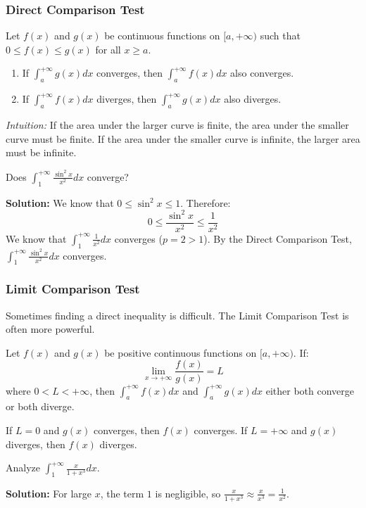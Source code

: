 \subsubsection{Direct Comparison Test}
\begin{theorem}
Let $f(x)$ and $g(x)$ be continuous functions on $[a, +\infty)$ such that $0 \leq f(x) \leq g(x)$ for all $x \geq a$.
\begin{enumerate}
    \item If $\int_a^{+\infty} g(x) dx$ converges, then $\int_a^{+\infty} f(x) dx$ also converges.
    \item If $\int_a^{+\infty} f(x) dx$ diverges, then $\int_a^{+\infty} g(x) dx$ also diverges.
\end{enumerate}
\end{theorem}
\textit{Intuition:} If the area under the larger curve is finite, the area under the smaller curve must be finite. If the area under the smaller curve is infinite, the larger area must be infinite.
\begin{example}

Does $\int_1^{+\infty} \frac{\sin^2 x}{x^2} dx$ converge?
\end{example}
\textbf{Solution:} We know that $0 \leq \sin^2 x \leq 1$. Therefore:
\[
0 \leq \frac{\sin^2 x}{x^2} \leq \frac{1}{x^2}
\]
We know that $\int_1^{+\infty} \frac{1}{x^2} dx$ converges ($p=2 > 1$). By the Direct Comparison Test, $\int_1^{+\infty} \frac{\sin^2 x}{x^2} dx$ converges.
\subsubsection{Limit Comparison Test}

Sometimes finding a direct inequality is difficult. The Limit Comparison Test is often more powerful.

\begin{theorem}
Let $f(x)$ and $g(x)$ be positive continuous functions on $[a, +\infty)$. If:
\[
\lim_{x \to +\infty} \frac{f(x)}{g(x)} = L
\]
where $0 < L < +\infty$, then $\int_a^{+\infty} f(x) dx$ and $\int_a^{+\infty} g(x) dx$ either both converge or both diverge.
\end{theorem}
If $L=0$ and $g(x)$ converges, then $f(x)$ converges. If $L=+\infty$ and $g(x)$ diverges, then $f(x)$ diverges.
\begin{example}
Analyze $\int_1^{+\infty} \frac{x}{1+x^3} dx$.
\end{example}

\textbf{Solution:} For large $x$, the term $1$ is negligible, so $\frac{x}{1+x^3} \approx \frac{x}{x^3} = \frac{1}{x^2}$.

